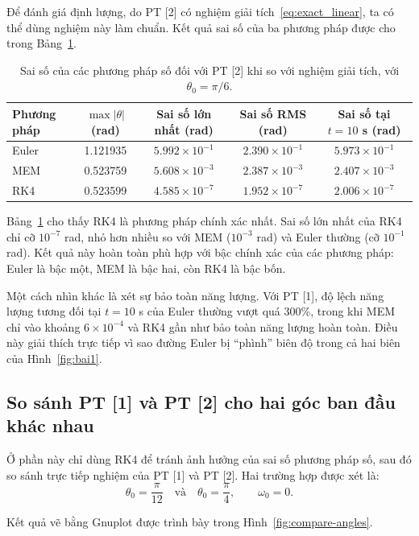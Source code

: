 \documentclass{article}
\begin{document}
Để đánh giá định lượng, do PT [2] có nghiệm giải tích~\eqref{eq:exact_linear}, ta có thể dùng nghiệm này làm chuẩn. Kết quả sai số của ba phương pháp được cho trong Bảng~\ref{tab:error_linear}.

\begin{table}[H]
\centering
\caption{Sai số của các phương pháp số đối với PT [2] khi so với nghiệm giải tích, với $\theta_0=\pi/6$.}
\label{tab:error_linear}
\begin{tabular}{lcccc}
\toprule
Phương pháp & $\max |\theta|$ (rad) & Sai số lớn nhất (rad) & Sai số RMS (rad) & Sai số tại $t=10$ s (rad) \\
\midrule
Euler & 1.121935 & $5.992\times 10^{-1}$ & $2.390\times 10^{-1}$ & $5.973\times 10^{-1}$ \\
MEM   & 0.523759 & $5.608\times 10^{-3}$ & $2.387\times 10^{-3}$ & $2.407\times 10^{-3}$ \\
RK4   & 0.523599 & $4.585\times 10^{-7}$ & $1.952\times 10^{-7}$ & $2.006\times 10^{-7}$ \\
\bottomrule
\end{tabular}
\end{table}

Bảng~\ref{tab:error_linear} cho thấy RK4 là phương pháp chính xác nhất. Sai số lớn nhất của RK4 chỉ cỡ $10^{-7}$ rad, nhỏ hơn nhiều so với MEM ($10^{-3}$ rad) và Euler thường (cỡ $10^{-1}$ rad). Kết quả này hoàn toàn phù hợp với bậc chính xác của các phương pháp: Euler là bậc một, MEM là bậc hai, còn RK4 là bậc bốn.

Một cách nhìn khác là xét sự bảo toàn năng lượng. Với PT [1], độ lệch năng lượng tương đối tại $t=10$ s của Euler thường vượt quá 300\%, trong khi MEM chỉ vào khoảng $6\times 10^{-4}$ và RK4 gần như bảo toàn năng lượng hoàn toàn. Điều này giải thích trực tiếp vì sao đường Euler bị ``phình'' biên độ trong cả hai biên của Hình~\ref{fig:bai1}.

\subsection{So sánh PT [1] và PT [2] cho hai góc ban đầu khác nhau}

Ở phần này chỉ dùng RK4 để tránh ảnh hưởng của sai số phương pháp số, sau đó so sánh trực tiếp nghiệm của PT [1] và PT [2]. Hai trường hợp được xét là:
\[
\theta_0 = \frac{\pi}{12} \quad \text{và} \quad \theta_0 = \frac{\pi}{4},
\qquad \omega_0=0.
\]

Kết quả vẽ bằng Gnuplot được trình bày trong Hình~\ref{fig:compare-angles}.
\end{document}
